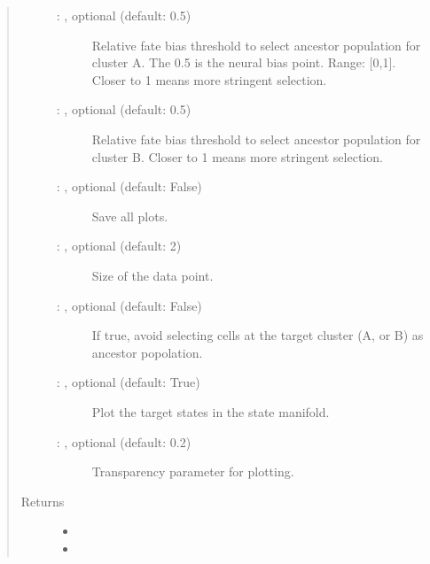 \documentclass[letterpaper,10pt,english]{sphinxmanual}
\begin{document}
\begin{fulllineitems}
\begin{quote}
\begin{description}
\begin{description}
\item[{ : , optional (default: 0.5)}] \leavevmode
Relative fate bias threshold to select ancestor population for cluster A.
The 0.5 is the neural bias point. Range: {[}0,1{]}.
Closer to 1 means more stringent selection.

\item[{ : , optional (default: 0.5)}] \leavevmode
Relative fate bias threshold to select ancestor population for cluster B.
Closer to 1 means more stringent selection.

\item[{ : , optional (default: False)}] \leavevmode
Save all plots.

\item[{ : , optional (default: 2)}] \leavevmode
Size of the data point.

\item[{ : , optional (default: False)}] \leavevmode
If true, avoid selecting cells at the target cluster (A, or B) as
ancestor popolation.

\item[{ : , optional (default: True)}] \leavevmode
Plot the target states in the state manifold.

\item[{ : , optional (default: 0.2)}] \leavevmode
Transparency parameter for plotting.

\end{description}

\item[{Returns}] \leavevmode
\begin{itemize}
\item {} 

\item {} 

\end{itemize}


\end{description}\end{quote}

\end{fulllineitems}
\end{document}
